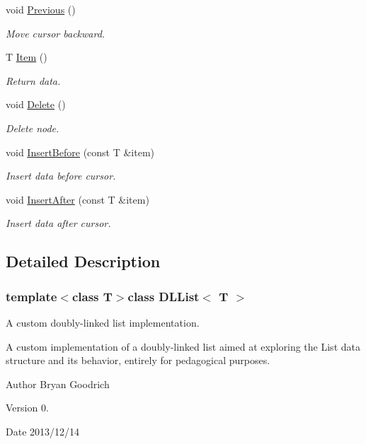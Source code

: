 \begin{DoxyCompactItemize}
void \hyperlink{classDLList_ab992a44d9ea1e6d7c4fa5cf9b8810a96}{Previous} ()
\begin{DoxyCompactList}\small\item\em Move cursor backward. \end{DoxyCompactList}\item 
T \hyperlink{classDLList_a78be8160baa864edcc73f1eb6f50ba0d}{Item} ()
\begin{DoxyCompactList}\small\item\em Return data. \end{DoxyCompactList}\item 
void \hyperlink{classDLList_a41213907b25f11371d7cd3cc64954035}{Delete} ()
\begin{DoxyCompactList}\small\item\em Delete node. \end{DoxyCompactList}\item 
void \hyperlink{classDLList_a3060479b9aaece8724c88eadd466fe60}{Insert\-Before} (const T \&item)
\begin{DoxyCompactList}\small\item\em Insert data before cursor. \end{DoxyCompactList}\item 
void \hyperlink{classDLList_a65b9b2c39e969a607b4ee375ebd1d36d}{Insert\-After} (const T \&item)
\begin{DoxyCompactList}\small\item\em Insert data after cursor. \end{DoxyCompactList}\end{DoxyCompactItemize}


\subsection{Detailed Description}
\subsubsection*{template$<$class T$>$class D\-L\-List$<$ T $>$}

A custom doubly-\/linked list implementation. 

A custom implementation of a doubly-\/linked list aimed at exploring the List data structure and its behavior, entirely for pedagogical purposes.

\begin{DoxyAuthor}{Author}
Bryan Goodrich 
\end{DoxyAuthor}
\begin{DoxyVersion}{Version}
0. 
\end{DoxyVersion}
\begin{DoxyDate}{Date}
2013/12/14 
\end{DoxyDate}


